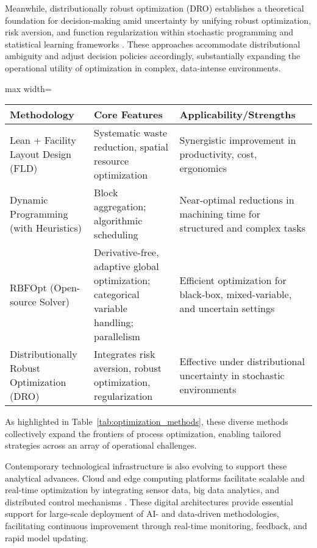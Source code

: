 Meanwhile, distributionally robust optimization (DRO) establishes a theoretical foundation for decision-making amid uncertainty by unifying robust optimization, risk aversion, and function regularization within stochastic programming and statistical learning frameworks \cite{ref76}. These approaches accommodate distributional ambiguity and adjust decision policies accordingly, substantially expanding the operational utility of optimization in complex, data-intense environments.

\begin{table*}[htbp]
  \centering
  \caption{Summary of Selected Optimization Approaches and Their Core Features}
  \label{tab:optimization_methods}
  \begin{adjustbox}{max width=\textwidth}
  \begin{tabular}{lll}
  \toprule
  \textbf{Methodology} & \textbf{Core Features} & \textbf{Applicability/Strengths} \\
  \midrule
  Lean + Facility Layout Design (FLD) & Systematic waste reduction, spatial resource optimization & Synergistic improvement in productivity, cost, ergonomics \\
  Dynamic Programming (with Heuristics) & Block aggregation; algorithmic scheduling & Near-optimal reductions in machining time for structured and complex tasks \\
  RBFOpt (Open-source Solver) & Derivative-free, adaptive global optimization; categorical variable handling; parallelism & Efficient optimization for black-box, mixed-variable, and uncertain settings \\
  Distributionally Robust Optimization (DRO) & Integrates risk aversion, robust optimization, regularization & Effective under distributional uncertainty in stochastic environments \\
  \bottomrule
  \end{tabular}
  \end{adjustbox}
\end{table*}

As highlighted in Table~\ref{tab:optimization_methods}, these diverse methods collectively expand the frontiers of process optimization, enabling tailored strategies across an array of operational challenges.

Contemporary technological infrastructure is also evolving to support these analytical advances. Cloud and edge computing platforms facilitate scalable and real-time optimization by integrating sensor data, big data analytics, and distributed control mechanisms \cite{ref80}. These digital architectures provide essential support for large-scale deployment of AI- and data-driven methodologies, facilitating continuous improvement through real-time monitoring, feedback, and rapid model updating.

